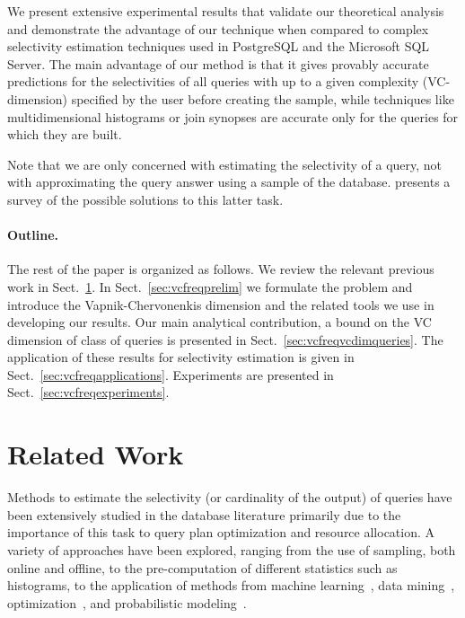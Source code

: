 We present extensive experimental results that validate our theoretical analysis
and demonstrate the advantage of our technique when compared to complex
selectivity estimation techniques used in PostgreSQL and the Microsoft SQL
Server. The main advantage of our method is that it gives provably accurate
predictions for the selectivities of all queries with up to a given complexity
(VC-dimension) specified by the user before creating the sample, while
techniques like multidimensional histograms or join synopses are accurate only
for the queries for which they are built.

Note that we are only concerned with estimating the selectivity of a query, not
with approximating the query answer using a sample of the database.
\citet{Das09} presents a survey of the possible solutions to this latter task. %

\paragraph{Outline.} The rest of the paper is organized as follows. We review
the relevant previous work in Sect.~\ref{sec:vcfreqprevwork}. In
Sect.~\ref{sec:vcfreqprelim} we formulate the problem and introduce the
Vapnik-Chervonenkis dimension and the related tools we use in developing our
results. Our main analytical contribution, a bound on the VC dimension  of class of queries is presented in Sect.~\ref{sec:vcfreqvcdimqueries}.  The application of these results for selectivity estimation is
given in Sect.~\ref{sec:vcfreqapplications}. Experiments are presented in
Sect.~\ref{sec:vcfreqexperiments}. 

\section{Related Work}\label{sec:vcfreqprevwork}
Methods to estimate the selectivity (or cardinality of the output) of queries
have been extensively studied in the database literature primarily due to the
importance of this task  to query plan optimization and resource allocation. A
variety of approaches have been explored, ranging from the use of sampling, both
online and offline, to the pre-computation of different statistics such as
histograms, to the application of methods from machine
learning~\citep{ChenMM90,HarangsriNS97}, data mining~\citep{GryzL04},
optimization~\citep{ChaudhuriDN07,MarklHKMST07}, and probabilistic
modeling~\citep{GetoorTK01,ReS10}.

